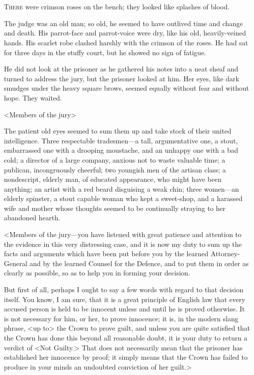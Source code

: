 \chapter[Chapter \thechapter]{}
\lettrine{T}{here} were crimson roses on the bench; they looked like splashes of blood.

\zz
The judge was an old man; so old, he seemed to have outlived time and change and death. His parrot-face and parrot-voice were dry, like his old, heavily-veined hands. His scarlet robe clashed harshly with the crimson of the roses. He had sat for three days in the stuffy court, but he showed no sign of fatigue.

He did not look at the prisoner as he gathered his notes into a neat sheaf and turned to address the jury, but the prisoner looked at him. Her eyes, like dark smudges under the heavy square brows, seemed equally without fear and without hope. They waited.

<Members of the jury\longdash>

The patient old eyes seemed to sum them up and take stock of their united intelligence. Three respectable tradesmen—a tall, argumentative one, a stout, embarrassed one with a drooping moustache, and an unhappy one with a bad cold; a director of a large company, anxious not to waste valuable time; a publican, incongruously cheerful; two youngish men of the artisan class; a nondescript, elderly man, of educated appearance, who might have been anything; an artist with a red beard disguising a weak chin; three women—an elderly spinster, a stout capable woman who kept a sweet-shop, and a harassed wife and mother whose thoughts seemed to be continually straying to her abandoned hearth.

<Members of the jury—you have listened with great patience and attention to the evidence in this very distressing case, and it is now my duty to sum up the facts and arguments which have been put before you by the learned Attorney-General and by the learned Counsel for the Defence, and to put them in order as clearly as possible, so as to help you in forming your decision.

But first of all, perhaps I ought to say a few words with regard to that decision itself. You know, I am sure, that it is a great principle of English law that every accused person is held to be innocent unless and until he is proved otherwise. It is not necessary for him, or her, to prove innocence; it is, in the modern slang phrase, <up to> the Crown to prove guilt, and unless you are quite satisfied that the Crown has done this beyond all reasonable doubt, it is your duty to return a verdict of <Not Guilty.> That does not necessarily mean that the prisoner has established her innocence by proof; it simply means that the Crown has failed to produce in your minds an undoubted conviction of her guilt.>

